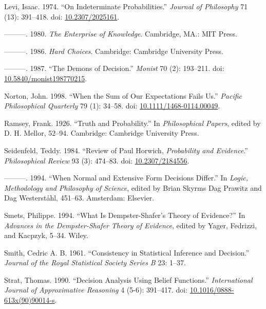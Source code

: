 \documentclass[
  10pt,
  letterpaper,
  DIV=11,
  numbers=noendperiod,
  twoside]{scrartcl}
\newlength{\cslhangindent}
\newenvironment{CSLReferences}[2] %
 {\begin{list}{}{%
  \setlength{\itemindent}{0pt}
  \setlength{\leftmargin}{0pt}
  \setlength{\parsep}{0pt}
  \ifodd #1
   \setlength{\leftmargin}{\cslhangindent}
   \setlength{\itemindent}{-1\cslhangindent}
  \fi
  \setlength{\itemsep}{#2\baselineskip}}}
 {\end{list}}
\begin{document}
\begin{CSLReferences}{1}{0}
Levi, Isaac. 1974. {``On Indeterminate Probabilities.''} \emph{Journal
of Philosophy} 71 (13): 391--418. doi:
\href{https://doi.org/10.2307/2025161}{10.2307/2025161}.

---------. 1980. \emph{The Enterprise of Knowledge}. Cambridge, MA.: MIT
Press.

---------. 1986. \emph{Hard Choices}. Cambridge: Cambridge University
Press.

---------. 1987. {``The Demons of Decision.''} \emph{Monist} 70 (2):
193--211. doi:
\href{https://doi.org/10.5840/monist198770215}{10.5840/monist198770215}.

Norton, John. 1998. {``When the Sum of Our Expectations Fails Us.''}
\emph{Pacific Philosophical Quarterly} 79 (1): 34--58. doi:
\href{https://doi.org/10.1111/1468-0114.00049}{10.1111/1468-0114.00049}.

Ramsey, Frank. 1926. {``Truth and Probability.''} In \emph{Philosophical
Papers}, edited by D. H. Mellor, 52--94. Cambridge: Cambridge University
Press.

Seidenfeld, Teddy. 1984. {``Review of Paul Horwich, \emph{Probability
and Evidence}.''} \emph{Philosophical Review} 93 (3): 474--83. doi:
\href{https://doi.org/10.2307/2184556}{10.2307/2184556}.

---------. 1994. {``When Normal and Extensive Form Decisions Differ.''}
In \emph{Logic, Methodology and Philosophy of Science}, edited by Brian
Skyrms Dag Prawitz and Dag Westerståhl, 451--63. Amsterdam: Elsevier.

Smets, Philippe. 1994. {``What Is Dempster-Shafer's Theory of
Evidence?''} In \emph{Advances in the Dempster-Shafer Theory of
Evidence}, edited by Yager, Fedrizzi, and Kacpzyk, 5--34. Wiley.

Smith, Cedric A. B. 1961. {``Consistency in Statistical Inference and
Decision.''} \emph{Journal of the Royal Statistical Society Series B}
23: 1--37.

Strat, Thomas. 1990. {``Decision Analysis Using Belief Functions.''}
\emph{International Journal of Approximative Reasoning} 4 (5-6):
391--417. doi:
\href{https://doi.org/10.1016/0888-613x(90)90014-s}{10.1016/0888-613x(90)90014-s}.


\end{CSLReferences}
\end{document}
